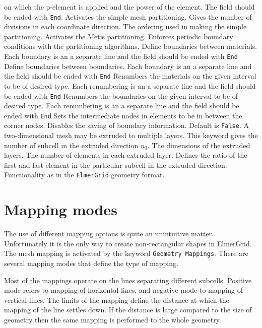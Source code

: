 on which the p-element is applied and the power of the element.
The field should be ended with \texttt{End}.
%
Activates the simple mesh partitioning.
Gives the number of divisions in each coordinate 
direction.
%
The ordering used in making the simple partitioning.
%
Activates the Metis partitioning.
%
Enforces periodic boundary conditions with the partitioning algorithms.
%
Define boundaries between materials. 
Each boundary is an a separate line
and the field should be ended with \texttt{End}
%
Define boundaries between boundaries.
Each boundary is an a separate line
and the field should be ended with \texttt{End}
%
Renumbers the materials on the given interval to be of desired type.
Each renumbering is an a separate line
and the field should be ended with \texttt{End}
%
Renumbers the boundaries on the given interval to be of desired type.
Each renumbering is an a separate line
and the field should be ended with \texttt{End}
%
Sets the intermediate nodes in elements to be in between 
the corner nodes.
%
Disables the saving of boundary information.
Default is \texttt{False}.
%
A two-dimensional mesh may be extruded to multiple layers. This
keyword gives the number of subcell in the extruded direction $n_3$.
The dimensions of the extruded layers.
The number of elements in each extruded layer.
Defines the ratio of the first and last element in the particular
subcell in the extruded direction.
Functionality as in the \texttt{ElmerGrid} geometry format.
%
\sifend



\section{Mapping modes}
The use of different mapping options is quite an 
unintuitive matter. Unfortunately it is the only way to 
create non-rectangular shapes in ElmerGrid. 
The mesh mapping is activated by the keyword \texttt{Geometry Mappings}.
There are several mapping modes that define the type of mapping.

Most of the mappings operate on the lines separating different subcells.
Positive mode refers to mapping of horizontal lines, 
and negative mode to mapping of vertical lines.
The limits of the mapping define the distance at which the 
mapping of the line settles down. If the distance is large compared to 
the size of geometry then the same mapping is performed to the 
whole geometry. 

